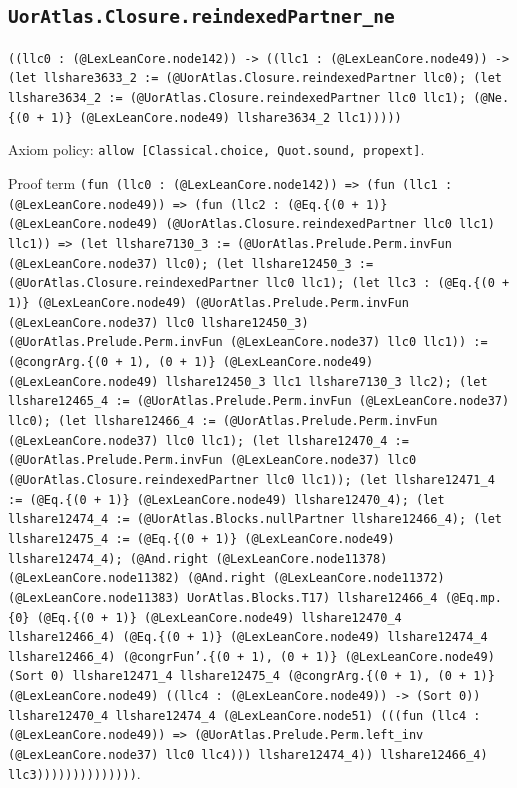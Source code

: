 \documentclass[11pt]{article}
\begin{document}
\subsection*{\texttt{UorAtlas.Closure.reindexedPartner\_ne}}
\noindent\texttt{((llc0 : (@LexLeanCore.node142)) -> ((llc1 : (@LexLeanCore.node49)) -> (let llshare3633\_2 := (@UorAtlas.Closure.reindexedPartner llc0); (let llshare3634\_2 := (@UorAtlas.Closure.reindexedPartner llc0 llc1); (@Ne.\{(0 + 1)\} (@LexLeanCore.node49) llshare3634\_2 llc1)))))}\par
\noindent Axiom policy: \texttt{allow [Classical.choice, Quot.sound, propext]}.\par
\noindent Proof term \texttt{(fun (llc0 : (@LexLeanCore.node142)) => (fun (llc1 : (@LexLeanCore.node49)) => (fun (llc2 : (@Eq.\{(0 + 1)\} (@LexLeanCore.node49) (@UorAtlas.Closure.reindexedPartner llc0 llc1) llc1)) => (let llshare7130\_3 := (@UorAtlas.Prelude.Perm.invFun (@LexLeanCore.node37) llc0); (let llshare12450\_3 := (@UorAtlas.Closure.reindexedPartner llc0 llc1); (let llc3 : (@Eq.\{(0 + 1)\} (@LexLeanCore.node49) (@UorAtlas.Prelude.Perm.invFun (@LexLeanCore.node37) llc0 llshare12450\_3) (@UorAtlas.Prelude.Perm.invFun (@LexLeanCore.node37) llc0 llc1)) := (@congrArg.\{(0 + 1), (0 + 1)\} (@LexLeanCore.node49) (@LexLeanCore.node49) llshare12450\_3 llc1 llshare7130\_3 llc2); (let llshare12465\_4 := (@UorAtlas.Prelude.Perm.invFun (@LexLeanCore.node37) llc0); (let llshare12466\_4 := (@UorAtlas.Prelude.Perm.invFun (@LexLeanCore.node37) llc0 llc1); (let llshare12470\_4 := (@UorAtlas.Prelude.Perm.invFun (@LexLeanCore.node37) llc0 (@UorAtlas.Closure.reindexedPartner llc0 llc1)); (let llshare12471\_4 := (@Eq.\{(0 + 1)\} (@LexLeanCore.node49) llshare12470\_4); (let llshare12474\_4 := (@UorAtlas.Blocks.nullPartner llshare12466\_4); (let llshare12475\_4 := (@Eq.\{(0 + 1)\} (@LexLeanCore.node49) llshare12474\_4); (@And.right (@LexLeanCore.node11378) (@LexLeanCore.node11382) (@And.right (@LexLeanCore.node11372) (@LexLeanCore.node11383) UorAtlas.Blocks.T17) llshare12466\_4 (@Eq.mp.\{0\} (@Eq.\{(0 + 1)\} (@LexLeanCore.node49) llshare12470\_4 llshare12466\_4) (@Eq.\{(0 + 1)\} (@LexLeanCore.node49) llshare12474\_4 llshare12466\_4) (@congrFun'.\{(0 + 1), (0 + 1)\} (@LexLeanCore.node49) (Sort 0) llshare12471\_4 llshare12475\_4 (@congrArg.\{(0 + 1), (0 + 1)\} (@LexLeanCore.node49) ((llc4 : (@LexLeanCore.node49)) -> (Sort 0)) llshare12470\_4 llshare12474\_4 (@LexLeanCore.node51) (((fun (llc4 : (@LexLeanCore.node49)) => (@UorAtlas.Prelude.Perm.left\_inv (@LexLeanCore.node37) llc0 llc4))) llshare12474\_4)) llshare12466\_4) llc3))))))))))))))}.\par
\end{document}
